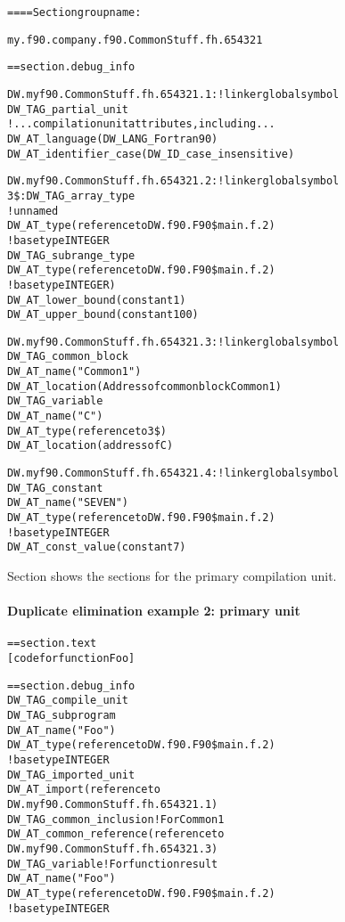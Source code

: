 \begin{alltt}
==== Section group name:

    my.f90.company.f90.CommonStuff.fh.654321

== section .debug\_info

DW.myf90.CommonStuff.fh.654321.1:    ! linker global symbol
    DW\_TAG\_partial\_unit
        ! ...compilation unit attributes, including...
        DW\_AT\_language(DW\_LANG\_Fortran90)
        DW\_AT\_identifier\_case(DW\_ID\_case\_insensitive)

DW.myf90.CommonStuff.fh.654321.2: ! linker global symbol
3\$: DW\_TAG\_array\_type
        ! unnamed
        DW\_AT\_type(reference to DW.f90.F90\$main.f.2)
            ! base type INTEGER
        DW\_TAG\_subrange\_type
            DW\_AT\_type(reference to DW.f90.F90\$main.f.2)
                ! base type INTEGER)
            DW\_AT\_lower\_bound(constant 1)
            DW\_AT\_upper\_bound(constant 100)

DW.myf90.CommonStuff.fh.654321.3: ! linker global symbol
    DW\_TAG\_common\_block
        DW\_AT\_name("Common1")
        DW\_AT\_location(Address of common block Common1)
        DW\_TAG\_variable
            DW\_AT\_name("C")
            DW\_AT\_type(reference to 3\$)
            DW\_AT\_location(address of C)

DW.myf90.CommonStuff.fh.654321.4: ! linker global symbol
    DW\_TAG\_constant
        DW\_AT\_name("SEVEN")
        DW\_AT\_type(reference to DW.f90.F90\$main.f.2)
            ! base type INTEGER
        DW\_AT\_const\_value(constant 7)
\end{alltt}

Section 
shows the sections for the primary compilation unit.



\paragraph{Duplicate elimination example 2: primary unit }
\label{app:duplicateeliminationexample2primaryunit}
\begin{alltt}
== section .text
    [code for function Foo]

== section .debug\_info
    DW\_TAG\_compile\_unit
        DW\_TAG\_subprogram
            DW\_AT\_name("Foo")
            DW\_AT\_type(reference to DW.f90.F90\$main.f.2)
                ! base type INTEGER
            DW\_TAG\_imported\_unit
                DW\_AT\_import(reference to
                    DW.myf90.CommonStuff.fh.654321.1)
            DW\_TAG\_common\_inclusion ! For Common1
                DW\_AT\_common\_reference(reference to
                    DW.myf90.CommonStuff.fh.654321.3)
            DW\_TAG\_variable ! For function result
                DW\_AT\_name("Foo")
                    DW\_AT\_type(reference to DW.f90.F90\$main.f.2)
                        ! base type INTEGER
\end{alltt}

